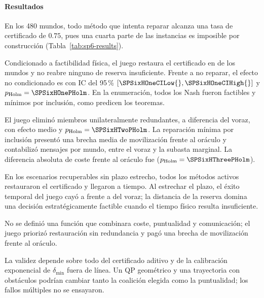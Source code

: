 \paragraph{Resultados}

En los 480 mundos, todo método que intenta reparar alcanza una tasa de certificado de $0.75$, pues una cuarta parte de las instancias es imposible por construcción (Tabla~\ref{tab:sp6-results}).

\begin{table}[!htbp]
  \centering
  \caption{Resultados agregados de E6-C sobre 480 mundos pareados por método.}
  \label{tab:sp6-results}
  \scriptsize
  \resizebox{\textwidth}{!}{}
  \viuownsource
\end{table}

Condicionado a factibilidad física, el juego restaura el certificado en \SPSixConditionalRestore{} de los mundos y no reabre ninguno de reserva insuficiente. Frente a no reparar, el efecto no condicionado es \SPSixHOneEffect{} con IC del 95\,\% $[\SPSixHOneCILow{},\SPSixHOneCIHigh{}]$ y $p_{\mathrm{Holm}}=\SPSixHOnePHolm$. En la enumeración, todos los Nash fueron factibles y mínimos por inclusión, como predicen los teoremas.

El juego eliminó miembros unilateralmente redundantes, a diferencia del voraz, con efecto medio \SPSixHTwoEffect{} y $p_{\mathrm{Holm}}=\SPSixHTwoPHolm$. La reparación mínima por inclusión presentó una brecha media de movilización \SPSixPotentialGap{} frente al oráculo y contabilizó \SPSixPotentialMessages{} mensajes por mundo, entre el voraz y la subasta marginal. La diferencia absoluta de coste frente al oráculo fue \SPSixHThreeEffect{} ($p_{\mathrm{Holm}}=\SPSixHThreePHolm$).

En los escenarios recuperables sin plazo estrecho, todos los métodos activos restauraron el certificado y llegaron a tiempo. Al estrechar el plazo, el éxito temporal del juego cayó a \SPSixTightPotentialSuccess{} frente a \SPSixTightGreedySuccess{} del voraz; la distancia de la reserva domina una decisión estratégicamente factible cuando el tiempo físico resulta insuficiente.


No se definió una función que combinara coste, puntualidad y comunicación; el juego priorizó restauración sin redundancia y pagó una brecha de movilización frente al oráculo.

La validez depende sobre todo del certificado aditivo y de la calibración exponencial de $\delta_{\min}$ fuera de línea. Un QP geométrico y una trayectoria con obstáculos podrían cambiar tanto la coalición elegida como la puntualidad; los fallos múltiples no se ensayaron.

